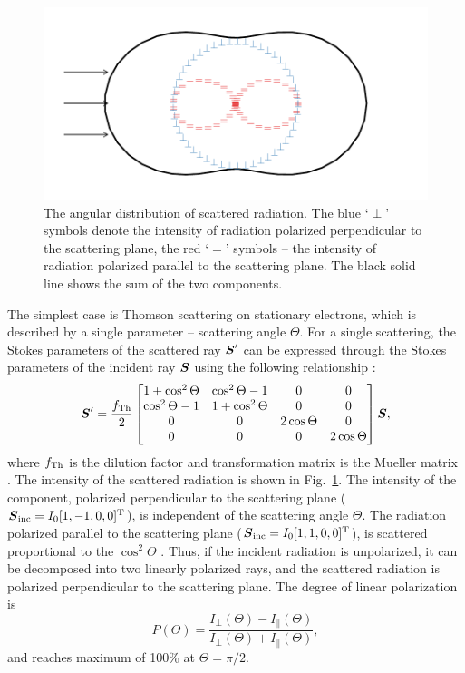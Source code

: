 \begin{figure}
    \centering
    \includegraphics[keepaspectratio, width = 1\linewidth]{images/scat_00.pdf}
    \caption{
        The angular distribution of scattered radiation.
        The blue `$\perp$' symbols denote the intensity of radiation polarized perpendicular to the scattering plane,
        the red `$=$' symbols -- the intensity of radiation polarized parallel to the scattering plane.
        The black solid line shows the sum of the two components.
    }
    \label{fig:simple_scat}
\end{figure}

The simplest case is Thomson scattering on stationary electrons, which is described by a single parameter -- scattering angle $\Theta$.
For a single scattering, the Stokes parameters of the scattered ray $\boldsymbol{S}^\prime$ can be expressed through the Stokes parameters of the incident ray $\boldsymbol{S}$ using the following relationship \citep{Cha60}: 
\begin{equation}
    \boldsymbol{S}^\prime = \frac{f_{\mathrm{Th}}}{2}
    \begin{bmatrix}
        1 + \cos^2\Theta & \cos^2\Theta - 1 & 0 & 0 \\
        \cos^2\Theta - 1 & 1 + \cos^2\Theta & 0 & 0 \\
        0 & 0 & 2\cos\Theta & 0 \\
        0 & 0 & 0 & 2\cos \Theta
    \end{bmatrix}
    \boldsymbol{S},
\end{equation} 
where $f_{\mathrm{Th}}$ is the dilution factor and transformation matrix is the Mueller matrix \citep[$\mtrx{M}_\mrm{Th}$;][]{PolarizedLight2}.
The intensity of the scattered radiation is shown in Fig.~\ref{fig:simple_scat}.
The intensity of the component, polarized perpendicular to the scattering plane ($\boldsymbol{S}_{\mathrm{inc}} = I_0[1, -1, 0, 0]^{\mathrm{T}}$), is independent of the scattering angle $\Theta$.
The radiation polarized parallel to the scattering plane ($\boldsymbol{S}_{\mathrm{inc}} = I_0[1, 1, 0, 0]^{\mathrm{T}}$), is scattered proportional to the $\cos^2\Theta$ \citep{LightScat}.
Thus, if the incident radiation is unpolarized, it can be decomposed into two linearly polarized rays, and the scattered radiation is polarized perpendicular to the scattering plane.
The degree of linear polarization is
\begin{equation}
    P(\Theta) = \frac{I_\perp(\Theta) - I_\parallel(\Theta)}{I_\perp(\Theta) + I_\parallel(\Theta)},
\end{equation}
and reaches maximum of 100\% at $\Theta = \pi/2$. 


